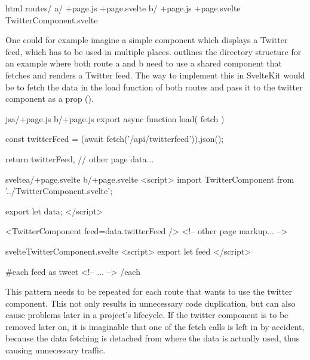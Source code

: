 \begin{listing}[h]
\begin{myminted}{html}{}
routes/
  a/
    +page.js
    +page.svelte
  b/
    +page.js
    +page.svelte
  TwitterComponent.svelte
\end{myminted}
\caption{Directory hierarchy that has a reusable component.}
\label{fig:evaluation-reusable-file-hierarchy}
\end{listing}

One could for example imagine a simple component which displays a Twitter feed, which has to be used in multiple places.  outlines the directory structure for an example where both route a and b need to use a shared component that fetches and renders a Twitter feed. The way to implement this in SvelteKit would be to fetch the data in the load function of both routes and pass it to the twitter component as a prop ().


\begin{listing}[h!]
\begin{myminted}{js}{a/+page.js b/+page.js}
export async function load({ fetch }) {

    const twitterFeed = (await fetch('/api/twitterfeed')).json();

    return {
        twitterFeed,
        // other page data...
    }
}

\end{myminted}
\begin{myminted}{svelte}{a/+page.svelte b/+page.svelte}
<script>
    import TwitterComponent from '../TwitterComponent.svelte';

    export let data;
</script>

<TwitterComponent feed={data.twitterFeed} />
<!-- other page markup... -->
\end{myminted}
\begin{myminted}{svelte}{TwitterComponent.svelte}
<script>
    export let feed
</script>

{#each feed as tweet}
    <!-- ... -->
{/each}
\end{myminted}
\caption{Example Implementation of a reusable component in SvelteKit}
\label{fig:evaluation-reusable-sveltekit}
\end{listing}

This pattern needs to be repeated for each route that wants to use the twitter component. This not only results in unnecessary code duplication, but can also cause problems later in a project's lifecycle. If the twitter component is to be removed later on, it is imaginable that one of the fetch calls is left in by accident, because the data fetching is detached from where the data is actually used, thus causing unnecessary traffic.

